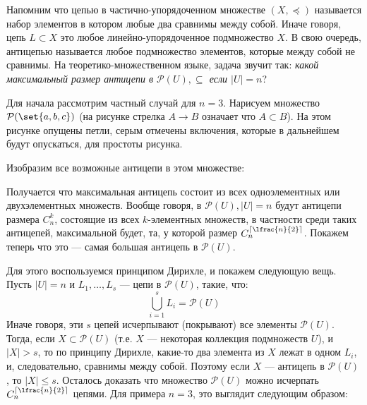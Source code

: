 \documentclass[a4paper,12pt,twoside]{article}
\begin{document}
\begin{solution}{}
    Напомним что цепью в частично-упорядоченном множестве \((X, \preceq)\) называется набор элементов в котором любые два сравнимы между собой. Иначе говоря, цепь \(L \subset X\) это любое линейно-упорядоченное подмножество \(X\). В свою очередь, антицепью называется любое подмножество элементов, которые между собой не сравнимы.  На теоретико-множественном языке, задача звучит так: \textit{какой максимальный размер антицепи в \(\mathcal{P}(U), \subseteq\) если \(|U| = n\)}?

    Для начала рассмотрим частный случай для \(n = 3\). Нарисуем множество \(\mathcal{P}(\set{a, b, c})\) (на рисунке стрелка \(A \to B\) означает что \(A \subset B\)). На этом рисунке опущены петли, серым отмечены включения, которые в дальнейшем будут опускаться, для простоты рисунка.
    \begin{center}
    \end{center}
    Изобразим все возможные антицепи в этом множестве:
    \begin{center}
        \vspace{6pt}
        \vspace{6pt}
    \end{center}
    Получается что максимальная антицепь состоит из всех одноэлементных или двухэлементных множеств. Вообще говоря, в \(\mathcal{P}(U), |U| = n\) будут антицепи размера \(C_n^k\), состоящие из всех \(k\)-элементных множеств, в частности среди таких антицепей, максимальной будет, та, у которой размер \(C_{n}^{\ceil{\lfrac{n}{2}}}\). Покажем теперь что это --- самая большая антицепь в \(\mathcal{P}(U)\). 
    
    Для этого воспользуемся принципом Дирихле, и покажем следующую вещь. Пусть \(|U| = n\) и \(L_1, \ldots, L_s\) --- цепи в \(\mathcal{P}(U)\), такие, что:
    \[
        \bigcup_{i = 1}^{s} L_i = \mathcal{P}(U)
    \]
    Иначе говоря, эти \(s\) цепей исчерпывают (покрывают) все элементы  \(\mathcal{P}(U)\). Тогда, если \(X \subset \mathcal{P}(U)\) (т.е. \(X\) --- некоторая коллекция подмножеств \(U\)), и \(|X| > s\), то по принципу Дирихле, какие-то два элемента из \(X\) лежат в одном \(L_i\), и, следовательно, сравнимы между собой. Поэтому если \(X\) --- антицепь в \(\mathcal{P}(U)\), то \(|X| \leq s\). Осталось доказать что множество \(\mathcal{P}(U)\) можно исчерпать \(C_{n}^{\ceil{\lfrac{n}{2}}}\) цепями. Для примера \(n = 3\), это выглядит следующим образом:
    \begin{center}
        \vspace{6pt}
        \vspace{6pt}
    \end{center}
    

\end{solution}
\end{document}
